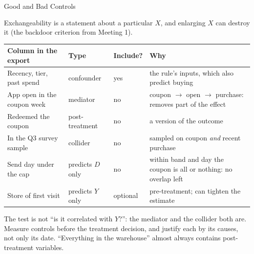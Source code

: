 \documentclass[aspectratio=169, 11pt, handout]{beamer}
\begin{document}
\begin{frame}{Good and Bad Controls}

Exchangeability is a statement about a particular $X$, and enlarging $X$ can destroy it (the backdoor criterion from Meeting 1).

\begin{center}
\footnotesize
\begin{tabular}{lllp{5.4cm}}
\toprule
\textbf{Column in the export} & \textbf{Type} & \textbf{Include?} & \textbf{Why} \\
\midrule
Recency, tier, past spend & confounder & \textcolor{sbgreen}{yes} & the rule's inputs, which also predict buying \\
App open in the coupon week & mediator & \textcolor{warnred}{no} & coupon $\to$ open $\to$ purchase: removes part of the effect \\
Redeemed the coupon & post-treatment & \textcolor{warnred}{no} & a version of the outcome \\
In the Q3 survey sample & collider & \textcolor{warnred}{no} & sampled on coupon \emph{and} recent purchase \\
Send day under the cap & predicts $D$ only & \textcolor{warnred}{no} & within band and day the coupon is all or nothing: no overlap left \\
Store of first visit & predicts $Y$ only & optional & pre-treatment; can tighten the estimate \\
\bottomrule
\end{tabular}
\end{center}

\medskip

The test is not ``is it correlated with $Y$?'': the mediator and the collider both are. Measure controls before the treatment decision, and justify each by its causes, not only its date. ``Everything in the warehouse'' almost always contains post-treatment variables.
\end{frame}
\end{document}
